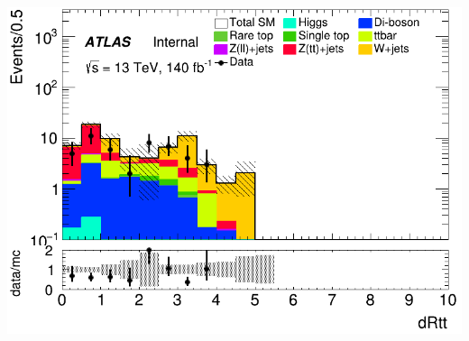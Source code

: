 \documentclass[usenames,dvipsnames]{beamer}
\begin{document}
\begin{frame}
\begin{minipage}{0.32\textwidth}
        \includegraphics[width=\textwidth]{graphics/HHH_met/HHH_met_dRtt.png}
    \end{minipage}
\end{frame}
\end{document}
